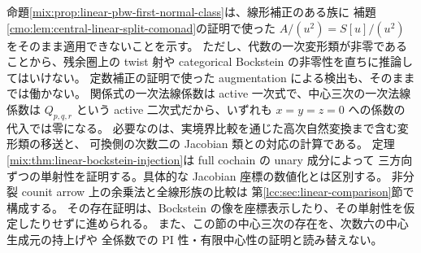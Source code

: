 \begin{remark}
\label{mix:rem:linear-pbw-bockstein-limit}
命題\ref{mix:prop:linear-pbw-first-normal-class}は、線形補正のある族に
補題\ref{cmo:lem:central-linear-split-comonad}の証明で使った
$A/(u^2)=S[u]/(u^2)$ をそのまま適用できないことを示す。
ただし、代数の一次変形類が非零であることから、残余圏上の twist 射や
categorical Bockstein の非零性を直ちに推論してはいけない。
定数補正の証明で使った augmentation による検出も、そのままでは働かない。
関係式の一次法線係数は active 一次式で、中心三次の一次法線係数は
$Q_{p,q,r}$ という active 二次式だから、いずれも
$x=y=z=0$ への係数の代入では零になる。
必要なのは、実境界比較を通じた高次自然変換まで含む変形類の移送と、
可換側の次数二の Jacobian 類との対応の計算である。
定理\ref{mix:thm:linear-bockstein-injection}は full cochain の unary 成分によって
三方向ずつの単射性を証明する。具体的な Jacobian 座標の数値化とは区別する。
非分裂 counit arrow 上の余乗法と全線形族の比較は
第\ref{lcc:sec:linear-comparison}節で構成する。
その存在証明は、Bockstein の像を座標表示したり、その単射性を仮定したりせずに進められる。
また、この節の中心三次の存在を、次数六の中心生成元の持上げや
全係数での PI 性・有限中心性の証明と読み替えない。
\end{remark}
